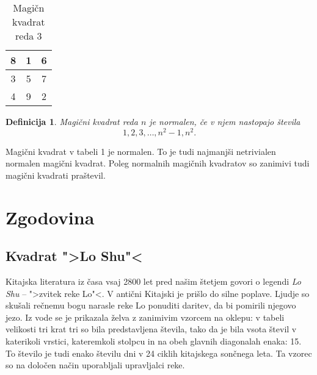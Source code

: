 \documentclass[a4paper,12pt]{article}
\newtheorem{definition}{Definicija}
\begin{document}
\begin{table}[h]
   \centering
   \caption{Magičn kvadrat reda 3}
   \label{table:mag3}
   \begin{tabular}{|c|c|c|}
      \hline
      8 & 1 & 6 \\
      \hline
      3 & 5 & 7 \\
      \hline
      4 & 9 & 2 \\
      \hline
   \end{tabular}
      

   
\end{table}

\begin{definition}
   Magični kvadrat reda $n$ je \emph{normalen}, če v njem nastopajo števila
   \begin{equation}
      1, 2, 3, \ldots, n^2-1, n^2.
   \end{equation}
\end{definition}   

Magični kvadrat v tabeli 1 je normalen.
To je tudi najmanjši netrivialen normalen magični kvadrat.
Poleg normalnih magičnih kvadratov so zanimivi tudi magični kvadrati praštevil.


\section{Zgodovina}

\subsection{Kvadrat ">Lo Shu"<}

Kitajska literatura iz časa vsaj 2800 let pred našim štetjem govori o legendi
\emph{Lo Shu} -- ">zvitek reke Lo"<. V antični Kitajski je prišlo do
silne poplave. Ljudje so skušali rečnemu bogu narasle reke Lo ponuditi daritev,
da bi pomirili njegovo jezo. Iz vode se je prikazala želva z zanimivim vzorcem
na oklepu: v tabeli velikosti tri krat tri so bila predstavljena števila, tako
da je bila vsota števil v katerikoli vrstici, kateremkoli stolpcu in na obeh
glavnih diagonalah enaka: 15. To število je tudi enako številu dni v 24 ciklih
kitajskega sončnega leta. Ta vzorec so na določen način uporabljali upravljalci
reke.
\end{document}
